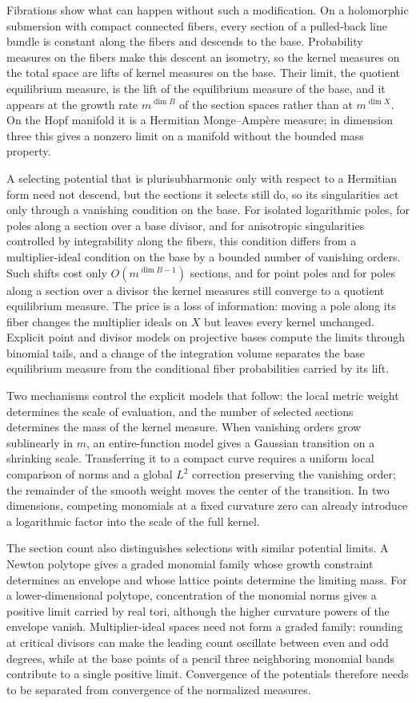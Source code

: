 Fibrations show what can happen without such a modification. On a holomorphic submersion with compact connected fibers, every section of a pulled-back line bundle is constant along the fibers and descends to the base. Probability measures on the fibers make this descent an isometry, so the kernel measures on the total space are lifts of kernel measures on the base. Their limit, the quotient equilibrium measure, is the lift of the equilibrium measure of the base, and it appears at the growth rate $m^{\dim B}$ of the section spaces rather than at $m^{\dim X}$. On the Hopf manifold it is a Hermitian Monge--Amp\`ere measure; in dimension three this gives a nonzero limit on a manifold without the bounded mass property.

A selecting potential that is plurisubharmonic only with respect to a Hermitian form need not descend, but the sections it selects still do, so its singularities act only through a vanishing condition on the base. For isolated logarithmic poles, for poles along a section over a base divisor, and for anisotropic singularities controlled by integrability along the fibers, this condition differs from a multiplier-ideal condition on the base by a bounded number of vanishing orders. Such shifts cost only $O(m^{\dim B-1})$ sections, and for point poles and for poles along a section over a divisor the kernel measures still converge to a quotient equilibrium measure. The price is a loss of information: moving a pole along its fiber changes the multiplier ideals on $X$ but leaves every kernel unchanged. Explicit point and divisor models on projective bases compute the limits through binomial tails, and a change of the integration volume separates the base equilibrium measure from the conditional fiber probabilities carried by its lift.

Two mechanisms control the explicit models that follow: the local metric weight determines the scale of evaluation, and the number of selected sections determines the mass of the kernel measure. When vanishing orders grow sublinearly in $m$, an entire-function model gives a Gaussian transition on a shrinking scale. Transferring it to a compact curve requires a uniform local comparison of norms and a global $L^2$ correction preserving the vanishing order; the remainder of the smooth weight moves the center of the transition. In two dimensions, competing monomials at a fixed curvature zero can already introduce a logarithmic factor into the scale of the full kernel.

The section count also distinguishes selections with similar potential limits. A Newton polytope gives a graded monomial family whose growth constraint determines an envelope and whose lattice points determine the limiting mass. For a lower-dimensional polytope, concentration of the monomial norms gives a positive limit carried by real tori, although the higher curvature powers of the envelope vanish. Multiplier-ideal spaces need not form a graded family: rounding at critical divisors can make the leading count oscillate between even and odd degrees, while at the base points of a pencil three neighboring monomial bands contribute to a single positive limit. Convergence of the potentials therefore needs to be separated from convergence of the normalized measures.

